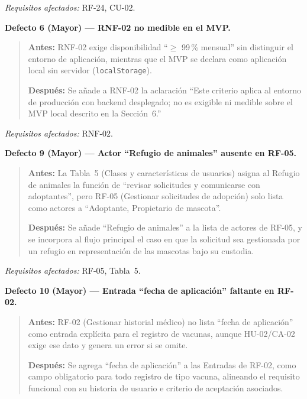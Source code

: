\documentclass[journal,onecolumn]{IEEEtran}
\begin{document}
\textit{Requisitos afectados:} RF-24, CU-02.

\vspace{6pt}
\textbf{Defecto 6 (Mayor) --- RNF-02 no medible en el MVP.}

\begin{quote}
	\textbf{Antes:} RNF-02 exige disponibilidad ``$\geq$ 99\,\% mensual'' sin distinguir el entorno de aplicación, mientras que el MVP se declara como aplicación local sin servidor (\texttt{localStorage}).
	
	\textbf{Después:} Se añade a RNF-02 la aclaración ``Este criterio aplica al entorno de producción con backend desplegado; no es exigible ni medible sobre el MVP local descrito en la Sección~6.''
\end{quote}

\textit{Requisitos afectados:} RNF-02.

\vspace{6pt}
\textbf{Defecto 9 (Mayor) --- Actor ``Refugio de animales'' ausente en RF-05.}

\begin{quote}
	\textbf{Antes:} La Tabla~5 (Clases y características de usuarios) asigna al Refugio de animales la función de ``revisar solicitudes y comunicarse con adoptantes'', pero RF-05 (Gestionar solicitudes de adopción) solo lista como actores a ``Adoptante, Propietario de mascota''.
	
	\textbf{Después:} Se añade ``Refugio de animales'' a la lista de actores de RF-05, y se incorpora al flujo principal el caso en que la solicitud sea gestionada por un refugio en representación de las mascotas bajo su custodia.
\end{quote}

\textit{Requisitos afectados:} RF-05, Tabla~5.

\vspace{6pt}
\textbf{Defecto 10 (Mayor) --- Entrada ``fecha de aplicación'' faltante en RF-02.}

\begin{quote}
	\textbf{Antes:} RF-02 (Gestionar historial médico) no lista ``fecha de aplicación'' como entrada explícita para el registro de vacunas, aunque HU-02/CA-02 exige ese dato y genera un error si se omite.
	
	\textbf{Después:} Se agrega ``fecha de aplicación'' a las Entradas de RF-02, como campo obligatorio para todo registro de tipo vacuna, alineando el requisito funcional con su historia de usuario e criterio de aceptación asociados.
\end{quote}
\end{document}
